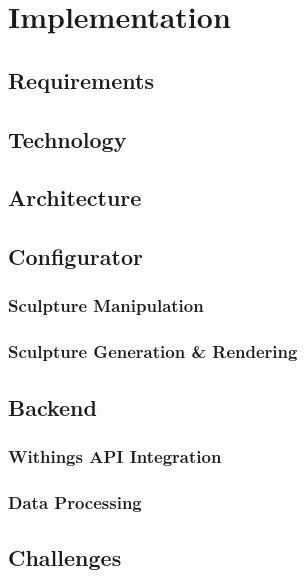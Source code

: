 \documentclass[../medieninformatik-arbeit.tex]{subfiles}
\begin{document}
\section{Implementation}
\label{ch:configurator}
\subsection{Requirements}
\subsection{Technology}
\subsection{Architecture}
\subsection{Configurator}
\subsubsection{Sculpture Manipulation}
\subsubsection{Sculpture Generation \& Rendering}
\label{sub:sculpturegeneration}
\subsection{Backend}
\subsubsection{Withings API Integration}
\subsubsection{Data Processing}
\subsection{Challenges}
\end{document}
